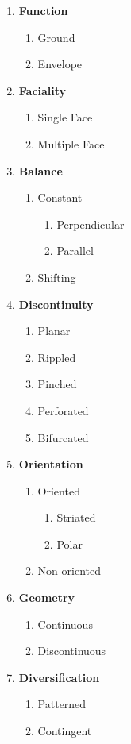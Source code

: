 \setlength{\columnseprule}{1pt}
\begin{multicols}{2}
\begin{enumerate}
	\item \textbf{Function}
		\begin{enumerate}
		\item Ground
		\item Envelope
		\end{enumerate}
	\item \textbf{Faciality}
		\begin{enumerate}
			\item Single Face
			\item Multiple Face
		\end{enumerate}
	\item \textbf{Balance}
		\begin{enumerate}
			\item Constant
				\begin{enumerate}
					\item Perpendicular
					\item Parallel
				\end{enumerate}
			\item Shifting
		\end{enumerate}
	\item \textbf{Discontinuity}
		\begin{enumerate}
			\item Planar
			\item Rippled
			\item Pinched
			\item Perforated
			\item Bifurcated
		\end{enumerate}
	\item \textbf{Orientation}
		\begin{enumerate}
			\item Oriented
				\begin{enumerate}
					\item Striated
					\item Polar
				\end{enumerate}
			\item Non-oriented
		\end{enumerate}
	\item \textbf{Geometry}
		\begin{enumerate}
			\item Continuous
			\item Discontinuous
		\end{enumerate}
	\item \textbf{Diversification}
		\begin{enumerate}
			\item Patterned
			\item Contingent
		\end{enumerate}
\end{enumerate}
\end{multicols}


